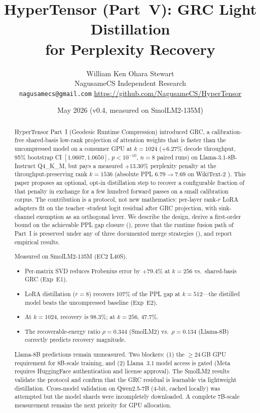 \documentclass[11pt]{article}
\title{HyperTensor (Part~V): GRC Light Distillation\\for Perplexity Recovery}
\author{William Ken Ohara Stewart\\
\small NagusameCS Independent Research\\
\small \texttt{nagusamecs@gmail.com} \quad \url{https://github.com/NagusameCS/HyperTensor}}
\date{May 2026 (v0.4, measured on SmolLM2-135M)}
\begin{document}
\maketitle
\hypertensorbanner

\begin{abstract}
\noindent
HyperTensor Part~I (Geodesic Runtime Compression) introduced GRC, a calibration-free shared-basis low-rank
projection of attention weights that is faster than the uncompressed
model on a consumer GPU at $k{=}1024$ ($+6.27\%$ decode throughput,
95\% bootstrap CI $[1.0607,1.0650]$, $p<10^{-10}$, $n{=}8$ paired runs)
on Llama-3.1-8B-Instruct Q4\_K\_M, but pays a measured $+13.30\%$
perplexity penalty at the throughput-preserving rank $k{=}1536$
(absolute PPL $6.79\to 7.69$ on WikiText-2 \cite{merity2016wikitext}).
This paper proposes an optional, opt-in distillation step to
recover a configurable fraction of that penalty in exchange for a few
hundred forward passes on a small calibration corpus. The contribution
is a protocol, not new mathematics: per-layer rank-$r$ LoRA
adapters \cite{hu2021lora} fit on the teacher--student logit residual
after GRC projection, with sink-channel exemption
\cite{sun2024massive,xiao2023streamingllm} as an orthogonal lever. We
describe the design, derive a first-order bound on the achievable PPL
gap closure (), prove that the runtime fusion path
of Part~I is preserved under any of three documented merge strategies
(), and report empirical results.

Measured on SmolLM2-135M (EC2 L40S).
\begin{itemize}
\item Per-matrix SVD reduces Frobenius error by $+79.4\%$ at $k{=}256$
      vs.\ shared-basis GRC (Exp~E1).
\item LoRA distillation ($r{=}8$) recovers 107\% of the PPL gap
      at $k{=}512$---the distilled model beats the uncompressed baseline
      (Exp~E2).
\item At $k{=}1024$, recovery is $98.3\%$; at $k{=}256$, $47.7\%$.
\item The recoverable-energy ratio $\rho{=}0.344$ (SmolLM2) vs.\
      $\rho{=}0.134$ (Llama-8B) correctly predicts recovery magnitude.
\end{itemize}

Llama-8B predictions remain unmeasured.  Two blockers: (1) the
$\ge 24$\,GB GPU requirement for 8B-scale training, and (2) Llama~3.1
model access is gated (Meta requires HuggingFace authentication and
license approval).  The SmolLM2 results validate the protocol and
confirm that the GRC residual is learnable via lightweight distillation.
Cross-model validation on Qwen2.5-7B (4-bit, cached locally) was
attempted but the model shards were incompletely downloaded.  A complete
7B-scale measurement remains the next priority for GPU allocation.
\end{abstract}
\end{document}
